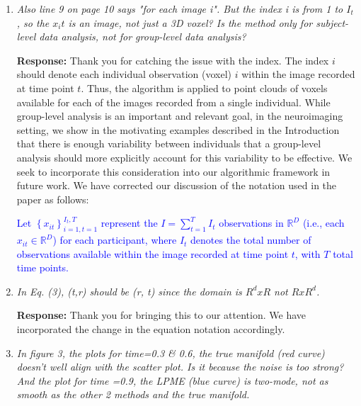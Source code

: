 \documentclass[12pt]{article}
\theoremstyle{definition}
\newcommand{\revision}[1]{\textcolor{blue}{#1}}
\begin{document}
\begin{enumerate}
Again, while we focus here on individual-level estimates, we agree that group-level inference is needed to answer a number of interesting research questions, and we plan to address this topic more fully in future work. We add a sentence to this effect in Section 6 as follows. 

\revision{While in this manuscript we focused on individual-level brain region segmentation, future work may consider modeling the data at the population level to draw statistical inferences on group comparisons or other hypotheses of interest.}

\item \textit{Also line 9 on page 10 says "for each image i". But the index i is from 1 to $I_t$, so the $x_it$ is an image, not just a 3D voxel? Is the method only for subject-level data analysis, not for group-level data analysis?}

  {\bf Response:} Thank you for catching the issue with the index. The index $i$ should denote each individual observation (voxel) $i$ within the image recorded at time point $t$. Thus, the algorithm is applied to point clouds of voxels available for each of the images recorded from a single individual. While group-level analysis is an important and relevant goal, in the neuroimaging setting, we show in the motivating examples described in the Introduction that there is enough variability between individuals that a group-level analysis should more explicitly account for this variability to be effective. We seek to incorporate this consideration into our algorithmic framework in future work. We have corrected our discussion of the notation used in the paper as follows:

\revision{Let $\left\{x_{it}\right\}_{i=1, t=1}^{I_t, T}$ represent the $I = \sum_{t=1}^{T}I_t$ observations in $\mathbb{R}^D$ (i.e., each $x_{it}\in\mathbb{R}^D$) for each participant, where $I_t$ denotes the total number of observations available within the image recorded at time point $t$, with $T$ total time points.}


\item \textit{In Eq. (3), (t,r) should be (r, t) since the domain is $R^d x R$ not $R x R^d$.}

{\bf Response:} Thank you for bringing this to our attention. We have incorporated the change in the equation notation accordingly.

\item \textit{In figure 3, the plots for time=0.3 \& 0.6, the true manifold (red curve) doesn’t well align with the scatter plot. Is it because the noise is too strong? And the plot for time =0.9, the LPME (blue curve) is two-mode, not as smooth as the other 2 methods and the true manifold.}


\end{enumerate}
\end{document}
